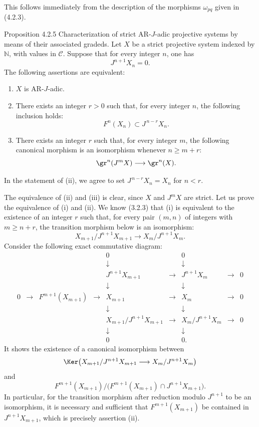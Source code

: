 \begin{prooftext}
This follows immediately from the description of the morphisms \(\omega_{pq}\) given in (4.2.3).
\end{prooftext}

\begin{statement}{Proposition 4.2.5}
Characterization of strict AR-\(J\)-adic projective systems by means of their associated gradeds. Let \(X\) be a strict projective system indexed by \(\mathbb N\), with values in \(\mathcal C\). Suppose that for every integer \(n\), one has
\[
J^{n+1}X_n=0.
\]
The following assertions are equivalent:
\begin{enumerate}[label=\textup{(\roman*)}]
\item \(X\) is AR-\(J\)-adic.
\item There exists an integer \(r>0\) such that, for every integer \(n\), the following inclusion holds:
\[
F^n(X_n)\subset J^{\,n-r}X_n.
\]
\item There exists an integer \(r\) such that, for every integer \(m\), the following canonical morphism is an isomorphism whenever \(n\ge m+r\):
\[
\gr^n(J^mX)\longrightarrow \gr^n(X).
\]
\end{enumerate}
In the statement of (ii), we agree to set \(J^{\,n-r}X_n=X_n\) for \(n<r\).
\end{statement}

\begin{prooftext}
The equivalence of (ii) and (iii) is clear, since \(X\) and \(J^mX\) are strict. Let us prove the equivalence of (i) and (ii). We know (3.2.3) that (i) is equivalent to the existence of an integer \(r\) such that, for every pair \((m,n)\) of integers with \(m\ge n+r\), the transition morphism below is an isomorphism:
\[
X_{m+1}/J^{n+1}X_{m+1}\longrightarrow X_m/J^{n+1}X_m.
\]
Consider the following exact commutative diagram:
\[
\begin{array}{ccccccccccc}
&&&&0&&0\\
&&&&\downarrow&&\downarrow\\
&&&&J^{n+1}X_{m+1}&\longrightarrow&J^{n+1}X_m&\longrightarrow&0\\
&&&&\downarrow&&\downarrow\\
0&\longrightarrow&F^{m+1}(X_{m+1})&\longrightarrow&X_{m+1}&\longrightarrow&X_m&\longrightarrow&0\\
&&&&\downarrow&&\downarrow\\
&&&&X_{m+1}/J^{n+1}X_{m+1}&\longrightarrow&X_m/J^{n+1}X_m&\longrightarrow&0\\
&&&&\downarrow&&\downarrow\\
&&&&0&&0 .
\end{array}
\]
It shows the existence of a canonical isomorphism between
\[
\Ker\bigl(X_{m+1}/J^{n+1}X_{m+1}
       \longrightarrow X_m/J^{n+1}X_m\bigr)
\]
and
\[
F^{m+1}(X_{m+1})/
\bigl(F^{m+1}(X_{m+1})\cap J^{n+1}X_{m+1}\bigr).
\]
In particular, for the transition morphism after reduction modulo \(J^{n+1}\) to be an isomorphism, it is necessary and sufficient that \(F^{m+1}(X_{m+1})\) be contained in \(J^{n+1}X_{m+1}\), which is precisely assertion (ii).
\end{prooftext}

